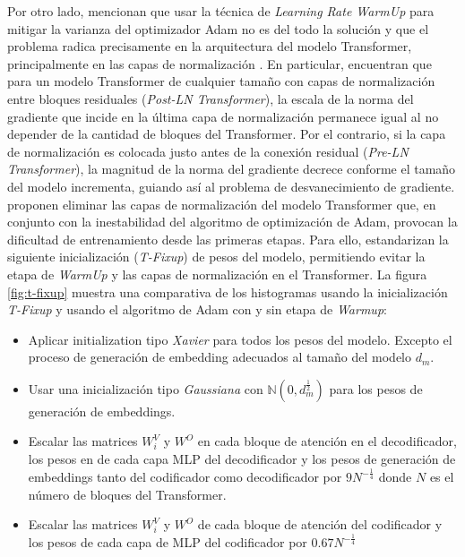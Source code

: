Por otro lado, \citeauthor{pmlr-v119-huang20f} mencionan que usar la técnica de \textit{Learning Rate
WarmUp} para mitigar la varianza del optimizador Adam no es del todo la solución y que el problema
radica precisamente en la arquitectura del modelo Transformer, principalmente en las capas de
normalización \cite{DBLP:journals/corr/abs-1804-09849} \cite{DBLP:journals/corr/abs-2002-04745}. En
particular, \citeauthor{DBLP:journals/corr/abs-2002-04745} encuentran que para un modelo Transformer
de cualquier tamaño con capas de normalización entre bloques residuales (\textit{Post-LN Transformer}),
la escala de la norma del gradiente que incide en la última capa de normalización permanece igual al
no depender de la cantidad de bloques del Transformer. Por el contrario, si la capa de normalización
es colocada justo antes de la conexión residual (\textit{Pre-LN Transformer}), la magnitud de la norma
del gradiente decrece conforme el tamaño del modelo incrementa, guiando así al problema de
desvanecimiento de gradiente. \citeauthor{pmlr-v119-huang20f} proponen eliminar las capas de
normalización del modelo Transformer que, en conjunto con la inestabilidad del algoritmo de optimización
de Adam, provocan la dificultad de entrenamiento desde las primeras etapas. Para ello, estandarizan la
siguiente inicialización (\textit{T-Fixup}) de pesos del modelo, permitiendo evitar la etapa de
\textit{WarmUp} y las capas de normalización en el Transformer. La figura \ref{fig:t-fixup} muestra
una comparativa de los histogramas usando la inicialización \textit{T-Fixup} y usando el algoritmo de
Adam con y sin etapa de \textit{Warmup}:

\begin{itemize}
    \item Aplicar initialization tipo \textit{Xavier} para todos los pesos del modelo.
          Excepto el proceso de generación de embedding adecuados al tamaño del modelo $d_m$.
    \item Usar una inicialización tipo \textit{Gaussiana} con $\mathbb{N}(0, d_m^\frac{1}{2})$ para
          los pesos de generación de embeddings.
    \item Escalar las matrices $W_i^V$ y $W^O$ en cada bloque de atención en el decodificador, los
          pesos en de cada capa MLP del decodificador y los pesos de generación de embeddings tanto
          del codificador como decodificador por $9N^{-\frac{1}{4}}$ donde $N$ es el número de bloques
          del Transformer.
    \item Escalar las matrices $W_i^V$ y $W^O$ de cada bloque de atención del codificador y los pesos
          de cada capa de MLP del codificador por $0.67N^{-\frac{1}{4}}$
\end{itemize}

